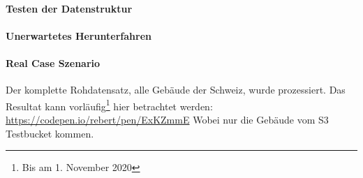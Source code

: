 \paragraph{Testen der Datenstruktur}


\paragraph{Unerwartetes Herunterfahren}


\paragraph{Real Case Szenario}

Der komplette Rohdatensatz, alle Gebäude der Schweiz, wurde prozessiert. Das Resultat kann vorläufig\footnote{Bis am 1. November 2020} hier betrachtet werden:
\href{https://codepen.io/rebert/pen/ExKZmmE}{https://codepen.io/rebert/pen/ExKZmmE} Wobei nur die Gebäude vom S3 Testbucket kommen.
